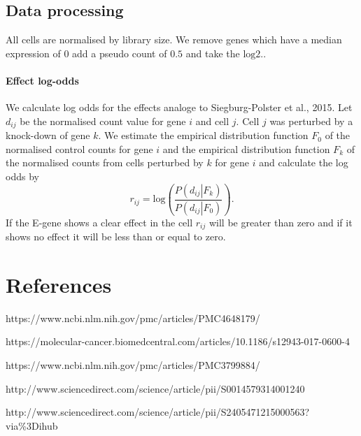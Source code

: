 \documentclass[12pt]{article}
\begin{document}
\subsection{Data processing}

All cells are normalised by library size. We remove genes which have a median expression of $0$ add a pseudo count of $0.5$ and take the $\mathrm{log2}$..

\paragraph{Effect log-odds}
We calculate log odds for the effects analoge to Siegburg-Polster et al., 2015. Let $d_{ij}$ be the normalised count value for gene $i$ and cell $j$. Cell $j$ was perturbed by a knock-down of gene $k$. We estimate the empirical distribution function $F_0$ of the normalised control counts for gene $i$ and the empirical distribution function $F_k$ of the normalised counts from cells perturbed by $k$ for gene $i$ and calculate the log odds by
\[r_{ij} = \mathrm{log} \left(\frac{P\left(d_{ij} \left|\right. F_k\right)}{P\left(d_{ij} \left|\right. F_0\right)}\right).\]
 If the E-gene shows a clear effect in the cell $r_{ij}$ will be greater than zero and if it shows no effect it will be less than or equal to zero.

\section{References}
https://www.ncbi.nlm.nih.gov/pmc/articles/PMC4648179/

https://molecular-cancer.biomedcentral.com/articles/10.1186/s12943-017-0600-4

https://www.ncbi.nlm.nih.gov/pmc/articles/PMC3799884/

http://www.sciencedirect.com/science/article/pii/S0014579314001240

http://www.sciencedirect.com/science/article/pii/S2405471215000563?via\%3Dihub
\end{document}
